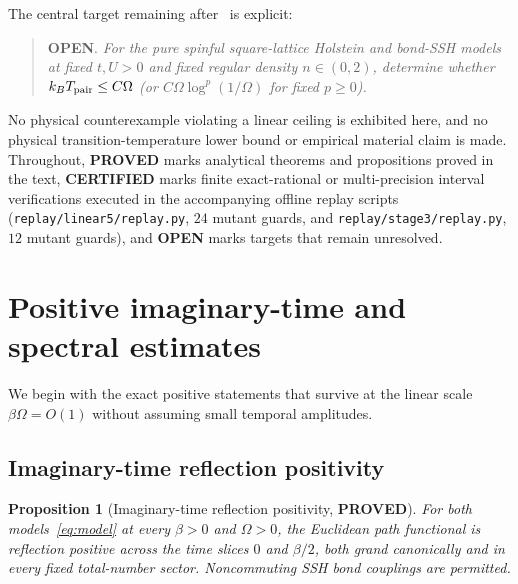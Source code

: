 \documentclass[11pt]{article}
\newtheorem{proposition}{Proposition}
\theoremstyle{remark}
\newcommand{\proved}{\textbf{PROVED}}
\newcommand{\certified}{\textbf{CERTIFIED}}
\newcommand{\openstatus}{\textbf{OPEN}}
\begin{document}
The central target remaining after~\cite{linear4} is explicit:
\begin{quote}
\openstatus. \textit{For the pure spinful square-lattice Holstein and bond-SSH models at fixed $t,U>0$ and fixed regular density $n\in(0,2)$, determine whether $k_BT_{\rm pair}\le C\Omega$ (or $C\Omega\log^p(1/\Omega)$ for fixed $p\ge 0$).}
\end{quote}
No physical counterexample violating a linear ceiling is exhibited here, and no physical transition-temperature lower bound or empirical material claim is made. Throughout, \proved{} marks analytical theorems and propositions proved in the text, \certified{} marks finite exact-rational or multi-precision interval verifications executed in the accompanying offline replay scripts (\nolinkurl{replay/linear5/replay.py}, $24$ mutant guards, and \nolinkurl{replay/stage3/replay.py}, $12$ mutant guards), and \openstatus{} marks targets that remain unresolved.

\section{Positive imaginary-time and spectral estimates}

We begin with the exact positive statements that survive at the linear scale $\beta\Omega=O(1)$ without assuming small temporal amplitudes.

\subsection{Imaginary-time reflection positivity}

\begin{proposition}[Imaginary-time reflection positivity, \proved]\label{prop:rp}
For both models~\eqref{eq:model} at every $\beta>0$ and $\Omega>0$, the Euclidean path functional is reflection positive across the time slices $0$ and $\beta/2$, both grand canonically and in every fixed total-number sector. Noncommuting SSH bond couplings are permitted.
\end{proposition}
\end{document}
